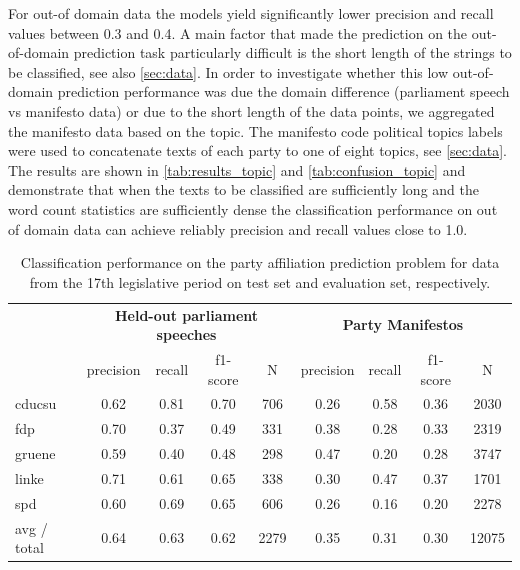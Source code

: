 \documentclass[runningheads,a4paper]{llncs}
\begin{document}
For out-of domain data the models yield significantly lower precision and recall values between 0.3 and 0.4.  
A main factor that made the prediction on the out-of-domain prediction task particularly difficult is the short length of the strings to be classified, see also \autoref{sec:data}. In order to investigate whether this low out-of-domain prediction performance was due the domain difference (parliament speech vs manifesto data) or due to the short length of the data points, we aggregated the manifesto data based on the topic. The manifesto code political topics labels were used to concatenate texts of each party to one of eight topics, see \autoref{sec:data}. The results are shown in \autoref{tab:results_topic} and \autoref{tab:confusion_topic} and demonstrate that when the texts to be classified are sufficiently long and the word count statistics are sufficiently dense the classification performance on out of domain data can achieve reliably precision and recall values close to 1.0. 

\begin{table}[t]
\begin{center}
\begin{tabular}{lcccccccc}
& \multicolumn{4}{c}{\bf Held-out parliament speeches} & \multicolumn{4}{c}{\bf Party Manifestos}\\
    &         precision    &recall &  f1-score  & N    &         precision    &recall &  f1-score  & N\\
\hline \hline
       cducsu   &    0.62  &    0.81  &    0.70  &     706&0.26    &  0.58   &   0.36    &  2030\\
        fdp    &   0.70   &   0.37  &    0.49    &   331&0.38   &   0.28    &  0.33   &   2319\\
     gruene &      0.59  &    0.40   &   0.48   &    298&0.47  &    0.20   &   0.28 &     3747\\
      linke    &   0.71   &   0.61  &    0.65    &   338&0.30   &   0.47   &   0.37    &  1701\\
        spd   &    0.60   &   0.69  &    0.65   &    606&0.26   &   0.16   &   0.20  &    2278\\
\hline
avg / total &      0.64   &   0.63   &   0.62    &  2279 &0.35    &  0.31 &     0.30   &  12075
%
\end{tabular}
\end{center}
\caption{
\label{tab:results_17}
Classification performance on the party affiliation prediction problem for data from the 17th legislative period on test set and evaluation set, respectively.
}
\end{table}
\end{document}
